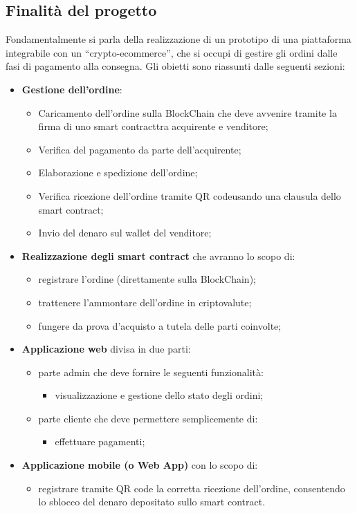 \subsection{Finalità del progetto}
Fondamentalmente si parla della realizzazione di un prototipo di una piattaforma integrabile con un “crypto-ecommerce”\glo, che si occupi di gestire gli ordini dalle fasi di pagamento alla consegna.
\newline
Gli obietti sono riassunti dalle seguenti sezioni:
\begin{itemize}
	\item \textbf{Gestione dell'ordine}:
		\begin{itemize}
			\item Caricamento dell'ordine sulla BlockChain che deve avvenire tramite la firma di uno {smart contract}\glo tra acquirente e venditore;
			\item Verifica del pagamento da parte dell'acquirente;
			\item Elaborazione e spedizione dell'ordine;
			\item Verifica ricezione dell'ordine tramite QR code\glo usando una clausula dello smart contract;
			\item Invio del denaro sul wallet del venditore;
		\end{itemize}
	\item \textbf{Realizzazione degli smart contract} che avranno lo scopo di:
		\begin{itemize}
			\item registrare l'ordine (direttamente sulla BlockChain);
			\item trattenere l'ammontare dell'ordine in criptovalute;
			\item fungere da prova d'acquisto a tutela delle parti coinvolte;
		\end{itemize}
	\item \textbf{Applicazione web} divisa in due parti:
		\begin{itemize}
			\item parte admin che deve fornire le seguenti funzionalità:
			\begin{itemize}
				\item visualizzazione e gestione dello stato degli ordini;
			\end{itemize}
			\item parte cliente che deve permettere semplicemente di:
			\begin{itemize}
				\item effettuare pagamenti;
			\end{itemize}
		\end{itemize}
	\item \textbf{Applicazione mobile (o Web App)} con lo scopo di:
		\begin{itemize}
			\item registrare tramite QR code la corretta ricezione dell'ordine, consentendo lo sblocco del denaro depositato sullo smart contract.
		\end{itemize}
\end{itemize}

